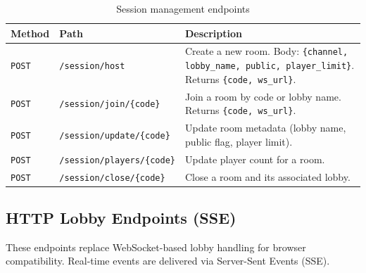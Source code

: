 \begin{table}[htbp]
    \centering
    \caption{Session management endpoints}
    \begin{tabular}{@{}llp{7cm}@{}}
        \toprule
        \textbf{Method} & \textbf{Path}                      & \textbf{Description}                                                                                                   \\
        \midrule
        \texttt{POST}   & \texttt{/session/host}             & Create a new room. Body: \texttt{\{channel, lobby\_name, public, player\_limit\}}. Returns \texttt{\{code, ws\_url\}}. \\
        \texttt{POST}   & \texttt{/session/join/\{code\}}    & Join a room by code or lobby name. Returns \texttt{\{code, ws\_url\}}.                                                 \\
        \texttt{POST}   & \texttt{/session/update/\{code\}}  & Update room metadata (lobby name, public flag, player limit).                                                          \\
        \texttt{POST}   & \texttt{/session/players/\{code\}} & Update player count for a room.                                                                                        \\
        \texttt{POST}   & \texttt{/session/close/\{code\}}   & Close a room and its associated lobby.                                                                                 \\
        \bottomrule
    \end{tabular}
\end{table}

\subsection{HTTP Lobby Endpoints (SSE)}
\label{app:c:lobby-endpoints}

These endpoints replace WebSocket-based lobby handling for browser compatibility. Real-time events are delivered via Server-Sent Events (SSE).

